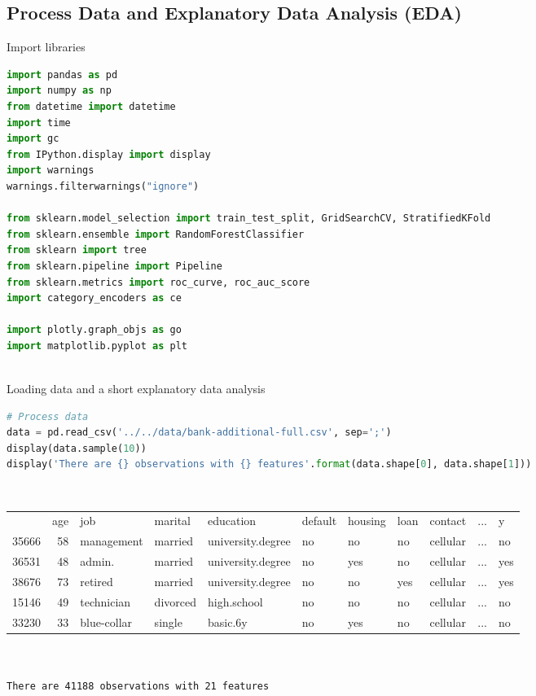 \documentclass[11pt,a4paper]{article}
\begin{document}
    \subsection{Process Data and Explanatory Data Analysis (EDA)}
    Import libraries
\begin{lstlisting}[language = Python]
import pandas as pd
import numpy as np
from datetime import datetime
import time
import gc
from IPython.display import display
import warnings
warnings.filterwarnings("ignore")

from sklearn.model_selection import train_test_split, GridSearchCV, StratifiedKFold
from sklearn.ensemble import RandomForestClassifier
from sklearn import tree
from sklearn.pipeline import Pipeline
from sklearn.metrics import roc_curve, roc_auc_score
import category_encoders as ce

import plotly.graph_objs as go
import matplotlib.pyplot as plt
\end{lstlisting}
\quad \\
    Loading data and a short explanatory data analysis
\begin{lstlisting}[language = Python]
# Process data
data = pd.read_csv('../../data/bank-additional-full.csv', sep=';')
display(data.sample(10))
display('There are {} observations with {} features'.format(data.shape[0], data.shape[1]))
\end{lstlisting}
\quad \\
    \begin{tabular}{lrlllllllcl}
        {} &  age &          job &   marital &          education & default & housing & loan &   contact & ... & y\\
        
        35666 &   58 &   management &   married &  university.degree &      no &      no &   no &  cellular & ... & no \\
        36531 &   48 &       admin. &   married &  university.degree &      no &     yes &   no &  cellular & ... & yes \\
        38676 &   73 &      retired &   married &  university.degree &      no &      no &  yes &  cellular & ... & yes \\
        15146 &   49 &   technician &  divorced &        high.school &      no &      no &   no &  cellular & ... & no \\
        33230 &   33 &  blue-collar &    single &           basic.6y &      no &     yes &   no &  cellular & ... & no \\
    \end{tabular} \\ \\
    \texttt{There are 41188 observations with 21 features}
    
\end{document}
